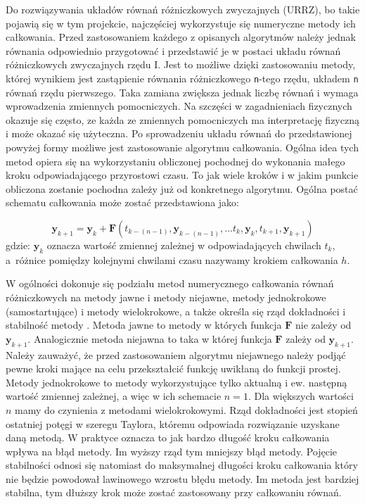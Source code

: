 Do rozwiązywania układów równań różniczkowych zwyczajnych (URRZ), bo takie pojawią się w tym projekcie, najczęściej wykorzystuje się numeryczne metody ich całkowania. Przed zastosowaniem każdego z opisanych algorytmów należy jednak równania odpowiednio przygotować i przedstawić je w postaci układu równań różniczkowych zwyczajnych rzędu I. Jest to możliwe dzięki zastosowaniu metody, której wynikiem jest zastąpienie równania różniczkowego \texttt{n}-tego rzędu, układem \texttt{n} równań rzędu pierwszego. Taka zamiana zwiększa jednak liczbę równań i wymaga wprowadzenia zmiennych pomocniczych. Na szczęści w zagadnieniach fizycznych okazuje się często, ze każda ze zmiennych pomocniczych ma interpretację fizyczną i może okazać się użyteczna. Po sprowadzeniu układu równań do przedstawionej powyżej formy możliwe jest zastosowanie algorytmu całkowania. Ogólna idea tych metod opiera się na wykorzystaniu obliczonej pochodnej do wykonania małego kroku odpowiadającego przyrostowi czasu. To jak wiele kroków i w jakim punkcie obliczona zostanie pochodna zależy już od konkretnego algorytmu.
Ogólna postać schematu całkowania może zostać przedstawiona jako:

\[
	\bm{y}_{k+1} = \bm{y}_{k} + \bm{F} \left( t_{k-(n-1)}, \bm{y}_{k-(n-1)}, ... t_{k}, \bm{y}_{k},  t_{k+1}, \bm{y}_{k+1}  \right)
\]
gdzie: $\bm{y}_{k}$ oznacza wartość zmiennej zależnej w odpowiadających chwilach $t_{k}$, a~różnice pomiędzy kolejnymi chwilami czasu nazywamy krokiem całkowania $h$.
 

W ogólności dokonuje się podziału metod numerycznego całkowania równań różniczkowych na metody jawne i metody niejawne, metody jednokrokowe (samostartujące) i metody wielokrokowe, a także określa się rząd dokładności i stabilność metody \cite{met_num_szum}. Metoda jawne to metody w których funkcja $\bm{F}$ nie zależy od $\bm{y}_{k+1}$. Analogicznie metoda niejawna to taka w której funkcja $\bm{F}$ zależy od $\bm{y}_{k+1}$. Należy zauważyć, że przed zastosowaniem algorytmu niejawnego należy podjąć pewne kroki mające na celu przekształcić funkcję uwikłaną do funkcji prostej. Metody jednokrokowe to metody wykorzystujące tylko aktualną i ew. następną wartość zmiennej zależnej, a więc w ich schemacie $n = 1$. Dla większych wartości $n$ mamy do czynienia z metodami wielokrokowymi. Rząd dokładności jest stopień ostatniej potęgi w szeregu Taylora, któremu odpowiada rozwiązanie uzyskane daną metodą. W praktyce oznacza to jak bardzo długość kroku całkowania wpływa na błąd metody. Im wyższy rząd tym mniejszy błąd metody. Pojęcie stabilności odnosi się natomiast do maksymalnej długości kroku całkowania który nie będzie powodował lawinowego wzrostu błędu metody. Im metoda jest bardziej stabilna, tym dłuższy krok może zostać zastosowany przy całkowaniu równań.\\

